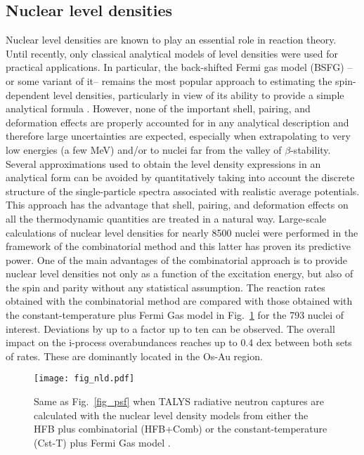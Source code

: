 \documentclass{aa}
\begin{document}
\subsection{Nuclear level densities}
\label{sect_nld}

Nuclear level densities are known to play an essential role in reaction theory.
Until recently, only classical analytical models of level densities were used for practical
applications. In particular, the  back-shifted Fermi gas model (BSFG) --or
some variant of it-- remains the most popular approach to estimating the spin-dependent
level densities, particularly in view of its ability to provide a simple analytical formula \citep{Capote09,Koning08}.
However, none of the important shell, pairing, and deformation effects are properly
accounted for in any analytical description and therefore large uncertainties are
expected, especially when extrapolating to very low energies (a few MeV) and/or to nuclei far from the valley of $\beta$-stability.
Several approximations used to obtain the level density expressions in an analytical form
can be avoided by quantitatively taking into account the discrete structure of the
single-particle spectra associated with realistic average potentials. This approach has
the advantage that shell, pairing, and deformation effects on all
the thermodynamic quantities are treated  in a natural way.
Large-scale calculations of nuclear level densities for nearly 8500 nuclei were performed in the framework of the combinatorial method  \citep{Goriely08b,Hilaire12} and  this latter has proven its predictive power. One of the main advantages of the combinatorial approach is to provide nuclear level densities not only  as a function of the excitation energy, but also of the spin and parity without any statistical assumption. The reaction rates obtained with the combinatorial method are compared with those obtained with the constant-temperature plus Fermi Gas model in Fig.~\ref{fig_nld} for the 793 nuclei of interest. Deviations by up to a factor up to ten can be observed. The overall impact on the i-process overabundances reaches up to 0.4 dex between both sets of rates. These are dominantly located in the Os-Au region.

\begin{figure}
\texttt{[image: fig\_nld.pdf]}
\caption{Same as Fig.~\ref{fig_psf} when {\sf TALYS} radiative neutron captures are calculated with the nuclear level density models from either the HFB plus combinatorial (HFB+Comb) \citep{Goriely08b} or the constant-temperature (Cst-T) plus Fermi Gas model \citep{Koning08}. }
\label{fig_nld}
\end{figure}
\end{document}
